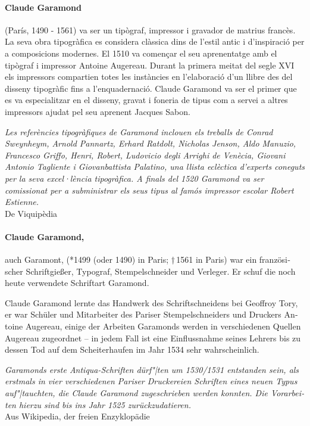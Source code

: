 \documentclass[pagesize,DIV14]{scrartcl}
\begin{document}
\begin{multicols}{2}
\begin{catalan}
\paragraph*{Claude Garamond} (París, 1490 - 1561) va ser un tipògraf, impressor i gravador de matrius francès. La seva obra tipogràfica es considera clàssica dins de l’estil antic i d'inspiració per a composicions modernes.
El 1510 va començar el seu aprenentatge amb el tipògraf i impressor Antoine Augereau. Durant la primera meitat del segle XVI els impressors compartien totes les instàncies en l’elaboració d’un llibre des del disseny tipogràfic fins a l’enquadernació. Claude Garamond va ser el primer que es va especialitzar en el disseny, gravat i foneria de tipus com a servei a altres impressors ajudat pel seu aprenent Jacques Sabon.\par
\textit{Les referències tipogràfiques de Garamond inclouen els treballs de Conrad Sweynheym, Arnold Pannartz, Erhard Ratdolt, Nicholas Jenson, Aldo Manuzio, Francesco Griffo, Henri, Robert, Ludovicio degli Arrighi de Venècia, Giovani Antonio Tagliente i Giovanbattista Palatino, una llista eclèctica d’experts coneguts per la seva excel·lència tipogràfica. A finals del 1520 Garamond va ser comissionat per a subministrar els seus tipus al famós impressor escolar Robert Estienne.}\\
{\scriptsize De Viquipèdia}
\end{catalan}
\begin{german}
\paragraph*{Claude Garamond,} auch Garamont, (*1499 (oder 1490) in Paris; †\,1561 in Paris) war ein französischer Schriftgießer, Typograf, Stempelschneider und Verleger. Er schuf die noch heute verwendete Schriftart Garamond.

Claude Garamond lernte das Handwerk des Schriftschneidens bei Geoffroy Tory, er war Schüler und Mitarbeiter des Pariser Stempelschneiders und Druckers Antoine Augereau, einige der Arbeiten Garamonds werden in verschiedenen Quellen Augereau zugeordnet – in jedem Fall ist eine Einflussnahme seines Lehrers bis zu dessen Tod auf dem Scheiterhaufen im Jahr 1534 sehr wahrscheinlich.

\textit{Garamonds erste Antiqua-Schriften dürf"|ten um 1530/1531 entstanden sein, als erstmals in vier verschiedenen Pariser Druckereien Schriften eines neuen Typus auf"|tauchten, die Claude Garamond zugeschrieben werden konnten. Die Vorarbeiten hierzu sind bis ins Jahr 1525 zurückzudatieren.}\\
{\scriptsize Aus Wikipedia, der freien Enzyklopädie}
\end{german}


\end{multicols}
\end{document}

